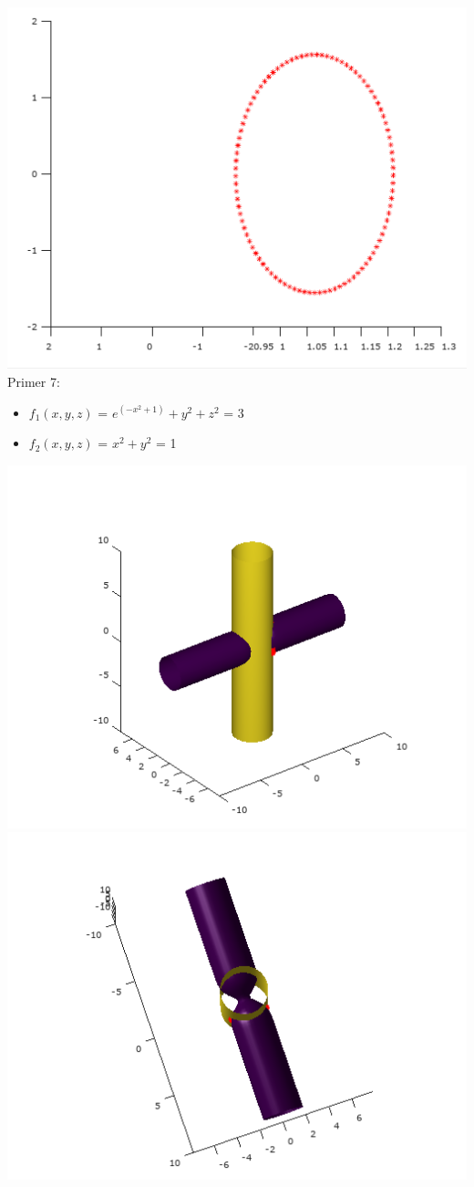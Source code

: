 \documentclass[]{article}
\begin{document}
	\includegraphics[scale=0.5]{primer6_4} 
	\\
	Primer 7:
	\begin{itemize}  
		\item $f_{1}(x,y,z)$ = $e^{(-x^{2}+1)}+y^{2}+z^{2}$ = 3
		\item $f_{2}(x,y,z)$ =  $x^2 + y^2$ = 1
	\end{itemize}
	\includegraphics[scale=0.5]{primer7_1}
	\includegraphics[scale=0.5]{primer7_2}
\end{document}
